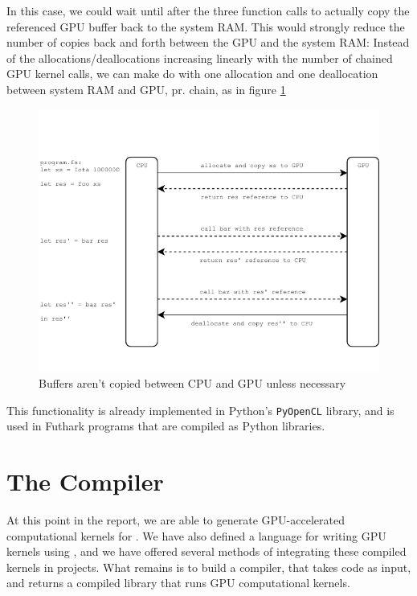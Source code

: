 In this case, we could wait until after the three function calls to actually
copy the referenced GPU buffer back to the system RAM. This would strongly reduce the
number of copies back and forth between the GPU and the system RAM:
Instead of the allocations/deallocations increasing linearly with the number of
chained GPU kernel calls, we can make do with one allocation and one
deallocation between system RAM and GPU, pr. chain, as in figure \ref{fig:withoutarraycopying}
\begin{figure}[H]
  \centering
  \includegraphics[scale=1.15]{chapters/figs/withoutarraycopying.pdf}
  \caption{Buffers aren't copied between CPU and GPU unless necessary}
  \label{fig:withoutarraycopying}
\end{figure}

This functionality is already implemented in Python's \texttt{PyOpenCL} library,
and is used in Futhark programs that are compiled as Python libraries.
\clearpage

\chapter{The \fshark{} Compiler}
At this point in the report, we are able to generate GPU-accelerated
computational kernels for \csharp{}. We
have also defined a language for writing GPU kernels using \fsharp{}, and we have
offered several methods of integrating these compiled \csharp{} kernels in
\fsharp{} projects. What remains is to build a compiler, that takes \fshark{}
code as input, and returns a compiled \csharp{} library that runs GPU
computational kernels.

